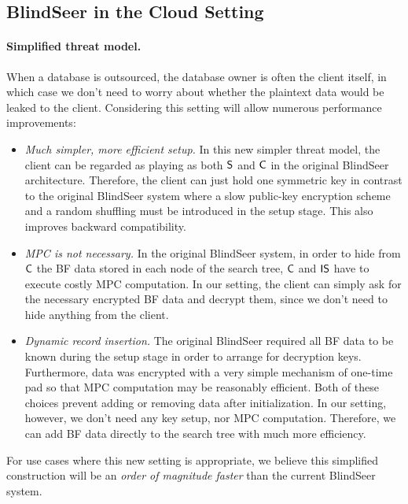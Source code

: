 
\subsection{BlindSeer in the Cloud Setting}
\label{sec:ext-blindseer}
\paragraph{Simplified threat model.}
When a database is outsourced, the database owner is often the client
itself, in which case we don't need to worry about whether the plaintext data
would be leaked to the client. Considering this setting will allow
numerous performance improvements:

\begin{itemize}\setlength\itemsep{0em}
\item {\em Much simpler, more efficient setup.}
In this new simpler threat model, the client can be regarded as playing as both
$\sf S$ and $\sf C$ in the original BlindSeer architecture. Therefore, the
client can just hold one symmetric key in contrast to the original BlindSeer
system where a slow public-key encryption scheme and a random shuffling
must be introduced in the setup stage.
This also improves backward compatibility.

\item {\em MPC is not necessary.} In the original BlindSeer system, in order to
hide from $\sf C$ the BF data stored in each node of the search tree, $\sf
C$ and $\sf IS$ have to execute costly MPC computation. In our setting, the
    client can simply ask for the necessary encrypted BF data and decrypt them,
    since we don't need to hide anything from the client.  


\item {\em Dynamic record insertion.}
The original BlindSeer required all BF data to be known during the setup
stage in order to arrange for decryption keys.
Furthermore, data was encrypted with a very
simple mechanism of one-time pad so that MPC computation may be reasonably
efficient.
Both of these choices prevent adding or removing data after initialization.
In our setting, however, we don't need any key setup, nor MPC computation.
Therefore, we can add BF data directly to the search tree with much more
efficiency.  
\end{itemize}
%
For use cases where this new setting is appropriate, we
believe this simplified construction will be an {\em order of magnitude faster}
than the current BlindSeer system.

